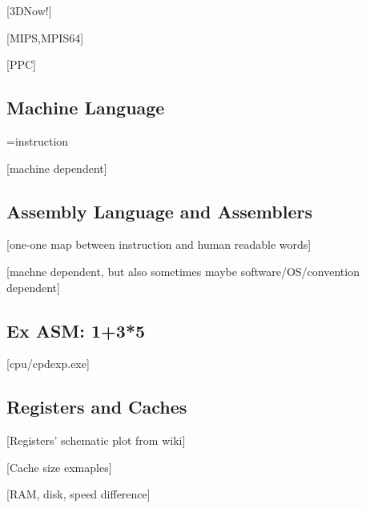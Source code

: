 \documentclass[main]{subfiles}
\begin{document}
[3DNow!]

[MIPS,MPIS64]

[PPC]

\subsection{Machine Language}
=instruction

[machine dependent]
\subsection{Assembly Language and Assemblers} 
[one-one map between instruction and human readable words]

[machne dependent, but also sometimes maybe software/OS/convention dependent]
\subsection{Ex ASM: 1+3*5}
[cpu/cpdexp.exe]

\subsection{Registers and Caches}
[Registers' schematic plot from wiki]

[Cache size exmaples]

[RAM, disk, speed difference]
\end{document}
